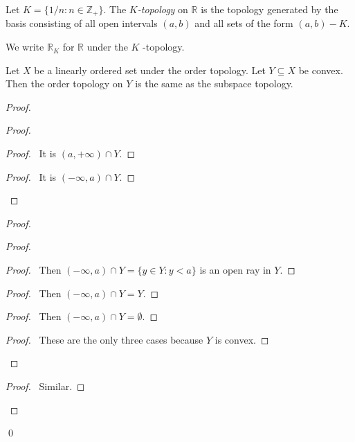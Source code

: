 \begin{df}[$K$-topology]
Let $K = \{ 1/n : n \in \mathbb{Z}_+ \}$. The \emph{$K$-topology} on $\mathbb{R}$ is the topology generated by the basis consisting of all open intervals $(a,b)$ and all sets of the form $(a,b) - K$.

We write $\mathbb{R}_K$ for $\mathbb{R}$ under the $K$ -topology.
\end{df}

\begin{prop}
Let $X$ be a linearly ordered set under the order topology. Let $Y \subseteq X$ be convex. Then the order topology on $Y$ is the same as the subspace topology.
\end{prop}

\begin{proof}
\pf
{}
\begin{proof}
	\begin{proof}
		\pf\ It is $(a, +\infty) \cap Y$.
	\end{proof}
	\begin{proof}
		\pf\ It is $(-\infty, a) \cap Y$.
	\end{proof}
\end{proof}
\begin{proof}
	\begin{proof}
		\begin{proof}
			\pf\ Then $(-\infty, a) \cap Y = \{ y \in Y : y < a\}$ is an open ray in $Y$.
		\end{proof}
		\begin{proof}
			\pf\ Then $(-\infty, a) \cap Y = Y$. 
		\end{proof}
		\begin{proof}
			\pf\ Then $(-\infty, a) \cap Y = \emptyset$. 
		\end{proof}
		\qedstep
		\begin{proof}
			\pf\ These are the only three cases because $Y$ is convex.
		\end{proof}
	\end{proof}
	\begin{proof}
		\pf\ Similar.
	\end{proof}
\end{proof}
\qed
\end{proof}

